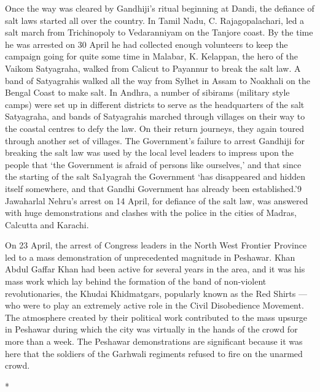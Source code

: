 \begin{multicols}{2}
Once the way was cleared by Gandhiji's ritual beginning at Dandi, the defiance of salt laws started all over the country. In Tamil Nadu, C. Rajagopalachari, led a salt march from Trichinopoly to Vedaranniyam on the Tanjore coast. By the time he was arrested on 30 April he had collected enough volunteers to keep the campaign going for quite some time in Malabar, K. Kelappan, the hero of the Vaikom Satyagraha, walked from Calicut to Payannur to break the salt law. A band of Satyagrahis walked all the way from Sylhet in Assam to Noakhali on the Bengal Coast to make salt. In Andhra, a number of sibirams (military style camps) were set up in different districts to serve as the headquarters of the salt Satyagraha, and bands of Satyagrahis marched through villages on their way to the coastal centres to defy the law. On their return journeys, they again toured through another set of villages. The Government's failure to arrest Gandhiji for breaking the salt law was used by the local level leaders to impress upon the people that `the Government is afraid of persons like ourselves,' and that since the starting of the salt Sa1yagrah the Government `has disappeared and hidden itself somewhere, and that Gandhi Government has already been established.'9 Jawaharlal Nehru's arrest on 14 April, for defiance of the salt law, was answered with huge demonstrations and clashes with the police in the cities of Madras, Calcutta and Karachi.

On 23 April, the arrest of Congress leaders in the North West Frontier Province led to a mass demonstration of unprecedented magnitude in Peshawar. Khan Abdul Gaffar Khan had been active for several years in the area, and it was his mass work which lay behind the formation of the band of non-violent revolutionaries, the Khudai Khidmatgars, popularly known as the Red Shirts --- who were to play an extremely active role in the Civil Disobedience Movement. The atmosphere created by their political work contributed to the mass upsurge in Peshawar during which the city was virtually in the hands of the crowd for more than a week. The Peshawar demonstrations are significant because it was here that the soldiers of the Garhwali regiments refused to fire on the unarmed crowd.

\begin{center}*\end{center}


\end{multicols}
